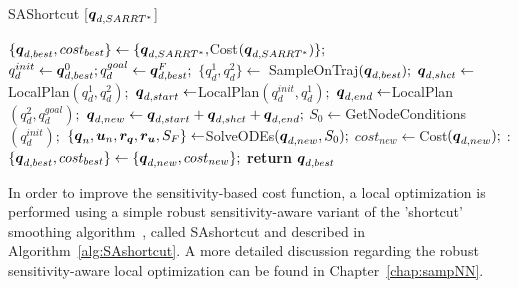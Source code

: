 \begin{algorithm}[htp]
    \caption{SAShortcut [$\boldsymbol{q}_{d,SARRT^*}$]}\label{alg:SAshortcut}
    \begin{algorithmic}[1]
        \State $\{\boldsymbol{q}_{d,best}, cost_{best}\} \gets \{\boldsymbol{q}_{d,SARRT^*}, $Cost$(\boldsymbol{q}_{d,SARRT^*}) \};$
        \State $q_d^{init} \gets \boldsymbol{q}_{d,best}^0; q_d^{goal} \gets \boldsymbol{q}_{d,best}^F;$
            \State $\{q_d^{1}, q_d^{2}\} \gets$ SampleOnTraj$(\boldsymbol{q}_{d,best});$
            \State $\boldsymbol{q}_{d,shct} \gets $LocalPlan$(q_d^{1}, q_d^{2});$
                \State $\boldsymbol{q}_{d,start} \gets $LocalPlan$(q_d^{init}, q_d^{1});$
                \State $\boldsymbol{q}_{d,end} \gets $LocalPlan$(q_d^{2}, q_d^{goal});$
                \State $\boldsymbol{q}_{d,new} \gets \boldsymbol{q}_{d,start}+\boldsymbol{q}_{d,shct}+\boldsymbol{q}_{d,end};$
                \State $S_0 \gets $GetNodeConditions$(q_d^{init});$
                \State $\{\boldsymbol{q}_n, \boldsymbol{u}_n, \boldsymbol{r_q}, \boldsymbol{r_u}, S_F\}  \gets $SolveODEs$(\boldsymbol{q}_{d,new}, S_0);$
                \State $cost_{new} \gets $Cost$(\boldsymbol{q}_{d,new});$
                :   
                        \State $\{\boldsymbol{q}_{d,best}, cost_{best}\} \gets \{\boldsymbol{q}_{d,new}, cost_{new}\};$
                    \EndIf
                \EndIf
            \EndIf
        \EndWhile
    \State \textbf{return} $\boldsymbol{q}_{d,best}$
    \end{algorithmic}
\end{algorithm}

In order to improve the sensitivity-based cost function, a local optimization is performed using a simple robust sensitivity-aware variant of the 'shortcut' smoothing algorithm~\cite{cShortcut}, called \gls{SAshortcut} and described in Algorithm~\ref{alg:SAshortcut}. 
A more detailed discussion regarding the robust sensitivity-aware local optimization can be found in Chapter~\ref{chap:sampNN}.

